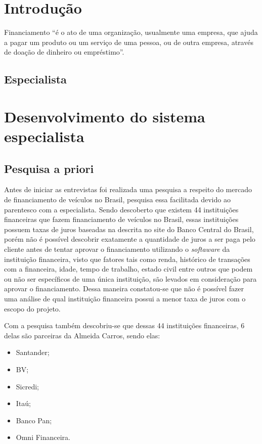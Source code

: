 \documentclass[12pt, a4paper]{article}
\begin{document}
\capa%
\tableofcontents%
\listoffigures\cleardoublepage%

\section{Introdução}\label{sec:intro}
Financiamento ``é o ato de uma organização,
usualmente uma empresa,
que ajuda a pagar um produto ou um serviço de uma pessoa,
ou de outra empresa,
através de doação de dinheiro ou empréstimo\cite{financiamento}''.

\subsection{Especialista}

\section{Desenvolvimento do sistema especialista}\label{sec:desenvolvimento}
\subsection{Pesquisa a priori}
Antes de iniciar as entrevistas foi realizada uma pesquisa a respeito do mercado de financiamento de veículos no Brasil,
pesquisa essa facilitada devido ao parentesco com a especialista.
Sendo descoberto que existem 44 instituições financeiras que fazem financiamento de veículos no Brasil\cite{taxas_juros_bcb},
essas instituições possuem taxas de juros baseadas na descrita no site do Banco Central do Brasil\cite{taxas_juros_bcb},
porém não é possível descobrir exatamente a quantidade de juros a ser paga pelo cliente antes de tentar aprovar o financiamento utilizando o \textit{softaware} da instituição financeira,
visto que fatores tais como renda, histórico de transações com a financeira, idade, tempo de trabalho, estado civil entre outros que podem ou não ser específicos de uma única instituição, são levados em consideração para aprovar o financiamento.
Dessa maneira constatou-se que não é possível fazer uma análise de qual instituição financeira possui a menor taxa de juros com o escopo do projeto.

Com a pesquisa também descobriu-se que dessas 44 instituições financeiras, 6 delas são parceiras da Almeida Carros, sendo elas:
\begin{itemize}
    \item Santander;
    \item BV;
    \item Sicredi;
    \item Itaú;
    \item Banco Pan;
    \item Omni Financeira.
\end{itemize}
\end{document}
